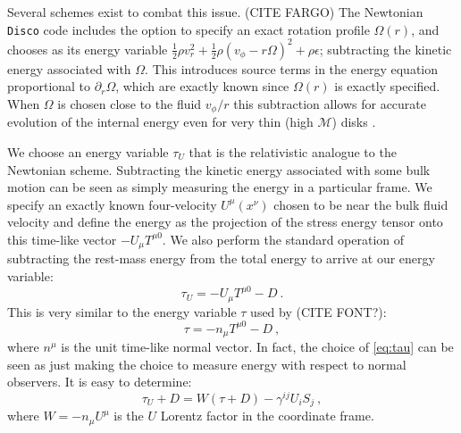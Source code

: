 \documentclass{emulateapj}
\newcommand{\eps}{\epsilon}
\newcommand{\Om}{\Omega}
\newcommand{\Mach}{\mathcal{M}}
\newcommand{\pd}{\partial}
\newcommand{\Disco}{{\texttt{Disco}}}
\begin{document}
Several schemes exist to combat this issue.  (CITE FARGO) The Newtonian \Disco{} code includes the option to specify an exact rotation profile $\Om(r)$, and chooses as its energy variable $\frac{1}{2}\rho v_r^2 + \frac{1}{2}\rho(v_\phi-r\Om)^2 + \rho \eps$; subtracting the kinetic energy associated with $\Om$. This introduces source terms in the energy equation proportional to $\pd_r \Om$, which are exactly known since $\Om(r)$ is exactly specified.  When $\Om$ is chosen close to the fluid $v_\phi / r$ this subtraction allows for accurate evolution of the internal energy even for very thin (high $\Mach$) disks \citep{Duffell16}.

We choose an energy variable $\tau_U$ that is the relativistic analogue to the Newtonian scheme.  Subtracting the kinetic energy associated with some bulk motion can be seen as simply measuring the energy in a particular frame. We specify an exactly known four-velocity $U^\mu(x^\nu)$ chosen to be near the bulk fluid velocity and define the energy as the projection of the stress energy tensor onto this time-like vector $-U_\mu T^{\mu 0}$.  We also perform the standard operation of subtracting the rest-mass energy from the total energy to arrive at our energy variable:
\begin{equation}
	\tau_U = -U_\mu T^{\mu 0} - D \ . \label{eq:tauU}
\end{equation}
This is very similar to the energy variable $\tau$ used by \citep{HARM, Duez05} (CITE FONT?):
\begin{equation}
	\tau = -n_\mu T^{\mu 0} - D \ , \label{eq:tau}
\end{equation}
where $n^\mu$ is the unit time-like normal vector. In fact, the choice of \eqref{eq:tau} can be seen as just making the choice to measure energy with respect to normal observers.  It is easy to determine: %
\begin{equation}
\tau_U + D = W\left(\tau + D\right) - \gamma^{ij}U_i S_j  \ ,
\end{equation}
where $W = -n_\mu U^\mu$ is the $U$ Lorentz factor in the coordinate frame.
\end{document}
